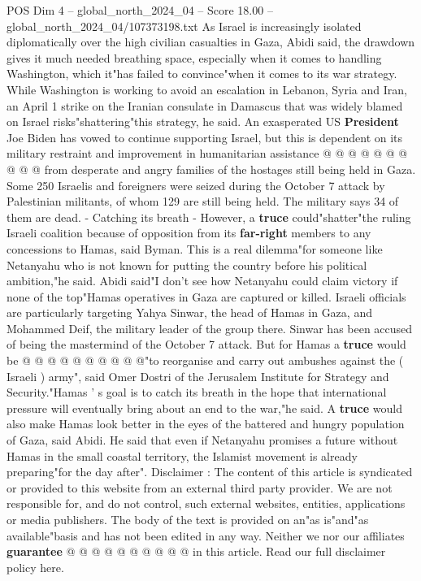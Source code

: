 \begin{textsample}{POS Dim 4 – global\_north\_2024\_04 – Score 18.00 – global\_north\_2024\_04/107373198.txt}
As Israel is increasingly isolated diplomatically over the high civilian casualties in Gaza, Abidi said, the drawdown gives it much needed breathing space, especially when it comes to handling Washington, which it"has failed to convince"when it comes to its war strategy.
While Washington is working to avoid an escalation in Lebanon, Syria and Iran, an April 1 strike on the Iranian consulate in Damascus that was widely blamed on Israel risks"shattering"this strategy, he said.
An exasperated US \textbf{President} Joe Biden has vowed to continue supporting Israel, but this is dependent on its military restraint and improvement in humanitarian assistance @ @ @ @ @ @ @ @ @ @ from desperate and angry families of the hostages still being held in Gaza.
Some 250 Israelis and foreigners were seized during the October 7 attack by Palestinian militants, of whom 129 are still being held.
The military says 34 of them are dead. - Catching its breath - However, a \textbf{truce} could"shatter"the ruling Israeli coalition because of opposition from its \textbf{far-right} members to any concessions to Hamas, said Byman.
This is a real dilemma"for someone like Netanyahu who is not known for putting the country before his political ambition,"he said.
Abidi said"I don't see how Netanyahu could claim victory if none of the top"Hamas operatives in Gaza are captured or killed.
Israeli officials are particularly targeting Yahya Sinwar, the head of Hamas in Gaza, and Mohammed Deif, the military leader of the group there.
Sinwar has been accused of being the mastermind of the October 7 attack.
But for Hamas a \textbf{truce} would be @ @ @ @ @ @ @ @ @ @"to reorganise and carry out ambushes against the ( Israeli ) army", said Omer Dostri of the Jerusalem Institute for Strategy and Security."Hamas ' s goal is to catch its breath in the hope that international pressure will eventually bring about an end to the war,"he said.
A \textbf{truce} would also make Hamas look better in the eyes of the battered and hungry population of Gaza, said Abidi.
He said that even if Netanyahu promises a future without Hamas in the small coastal territory, the Islamist movement is already preparing"for the day after".
Disclaimer : The content of this article is syndicated or provided to this website from an external third party provider.
We are not responsible for, and do not control, such external websites, entities, applications or media publishers.
The body of the text is provided on an"as is"and"as available"basis and has not been edited in any way.
Neither we nor our affiliates \textbf{guarantee} @ @ @ @ @ @ @ @ @ @ in this article.
Read our full disclaimer policy here.

\end{textsample}
